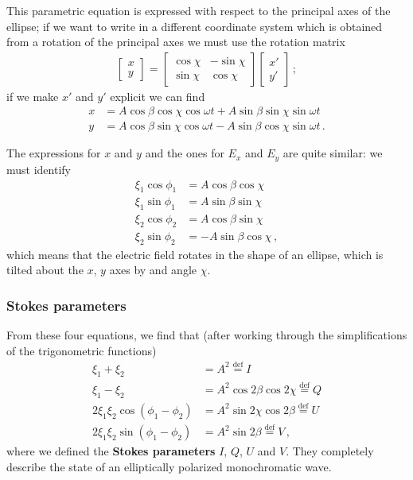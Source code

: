 \documentclass[main.tex]{subfiles}
\begin{document}

This parametric equation is expressed with respect to the principal axes of the ellipse; if we want to write in a different coordinate system which is obtained from a rotation of the principal axes we must use the rotation matrix 
%
\begin{align}
\left[\begin{array}{c}
x \\ 
y
\end{array}\right]
=
\left[\begin{array}{cc}
\cos \chi  & -\sin \chi   \\ 
\sin \chi  &  \cos \chi 
\end{array}\right]
\left[\begin{array}{c}
x' \\ 
y'
\end{array}\right]
\,;
\end{align}
%
if we make \(x'\) and \(y'\) explicit we can find 
%
\begin{align}
x &= A \cos \beta \cos \chi \cos \omega t + A \sin \beta \sin \chi \sin \omega t \\
y &= A \cos \beta \sin \chi \cos \omega t - A \sin \beta \cos \chi \sin \omega t 
\,.
\end{align}

The expressions for \(x\) and \(y\) and the ones for \(E_x\) and \(E_y\) are quite similar: we must identify 
%
\begin{align}
\xi_1 \cos \phi_1 &= A \cos \beta \cos \chi \\
\xi_1 \sin \phi_1 &= A \sin \beta \sin \chi \\
\xi_2 \cos \phi_2 &= A \cos \beta \sin \chi \\
\xi_2 \sin \phi_2 &= -A \sin \beta \cos \chi 
\,,
\end{align}
%
which means that the electric field rotates in the shape of an ellipse, which is tilted about the \(x\), \(y\) axes by and angle \(\chi \). 

\subsubsection{Stokes parameters}

From these four equations, we find that (after working through the simplifications of the trigonometric functions)
%
\begin{align}
\xi_1 + \xi_2 &= A^2 \overset{\text{def}}{=} I \\
\xi_1 - \xi_2 &= A^2 \cos 2 \beta \cos 2 \chi  \overset{\text{def}}{=} Q \\
2 \xi_1 \xi_2 \cos(\phi_1 - \phi_2 ) &= A^2 \sin 2 \chi \cos 2 \beta \overset{\text{def}}{=} U \\
2 \xi_1 \xi_2 \sin(\phi_1 - \phi_2 ) &= A^2 \sin 2 \beta \overset{\text{def}}{=} V
\,,
\end{align}
%
where we defined the \textbf{Stokes parameters} \(I\), \(Q\), \(U\) and \(V\). They completely describe the state of an elliptically polarized monochromatic wave. 
\end{document}
